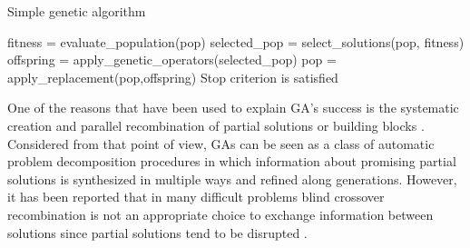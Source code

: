   \begin{algorithm}[ht!]
  \caption{Simple genetic algorithm}
   
    \begin{algorithmic}[1] 

      \REPEAT 
         \STATE  fitness = evaluate\_population(pop)
         \STATE  selected\_pop = select\_solutions(pop, fitness)
         \STATE  offspring = apply\_genetic\_operators(selected\_pop)
         \STATE  pop =  apply\_replacement(pop,offspring)
      \UNTIL Stop criterion is satisfied		
     \end{algorithmic}
	
 \label{Alg:GA}
  \end{algorithm}


  
 One of the reasons that have been used to explain GA's success is the systematic creation and parallel recombination of partial solutions or building blocks \cite{Goldberg:1989}. Considered from that point of view, GAs can be seen as a class of automatic problem decomposition procedures in which information about promising partial solutions is synthesized in multiple ways and refined along generations. However, it has been reported that in many difficult problems blind crossover recombination is not an appropriate choice to exchange information between solutions since partial solutions tend to be disrupted \cite{Watson_et_al:1998}.

 
 


